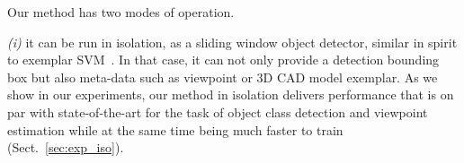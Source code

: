 % 
% 
% 
% 
% 
% 


Our method has two modes of operation.

{\em (i)} it can be run in isolation, as a sliding window object
detector, similar in spirit to exemplar SVM~\cite{Malisiewicz11}. In
that case, it can not only provide a detection bounding box but also
meta-data such as viewpoint or 3D CAD model exemplar.
As we show in our experiments, our method in isolation delivers
performance that is on par with state-of-the-art for the task of
object class detection and viewpoint estimation while at the same time
being much faster to train (Sect.~\ref{sec:exp_iso}).

